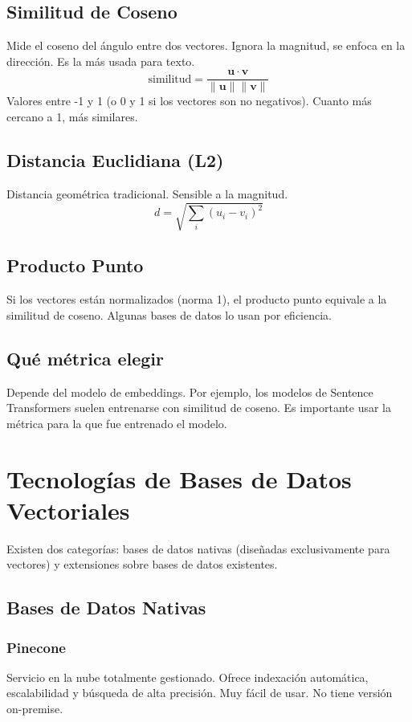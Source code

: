 \documentclass[12pt,a4paper,openany,oneside]{book}
\begin{document}
\section{Similitud de Coseno}
Mide el coseno del ángulo entre dos vectores. Ignora la magnitud, se enfoca en la dirección. Es la más usada para texto.
\[
\text{similitud} = \frac{\mathbf{u} \cdot \mathbf{v}}{\|\mathbf{u}\| \|\mathbf{v}\|}
\]
Valores entre -1 y 1 (o 0 y 1 si los vectores son no negativos). Cuanto más cercano a 1, más similares.

\section{Distancia Euclidiana (L2)}
Distancia geométrica tradicional. Sensible a la magnitud.
\[
d = \sqrt{\sum_{i} (u_i - v_i)^2}
\]

\section{Producto Punto}
Si los vectores están normalizados (norma 1), el producto punto equivale a la similitud de coseno. Algunas bases de datos lo usan por eficiencia.

\section{Qué métrica elegir}
Depende del modelo de embeddings. Por ejemplo, los modelos de Sentence Transformers suelen entrenarse con similitud de coseno. Es importante usar la métrica para la que fue entrenado el modelo.

\chapter{Tecnologías de Bases de Datos Vectoriales}
Existen dos categorías: bases de datos nativas (diseñadas exclusivamente para vectores) y extensiones sobre bases de datos existentes.

\section{Bases de Datos Nativas}
\subsection{Pinecone}
Servicio en la nube totalmente gestionado. Ofrece indexación automática, escalabilidad y búsqueda de alta precisión. Muy fácil de usar. No tiene versión on-premise.
\end{document}
